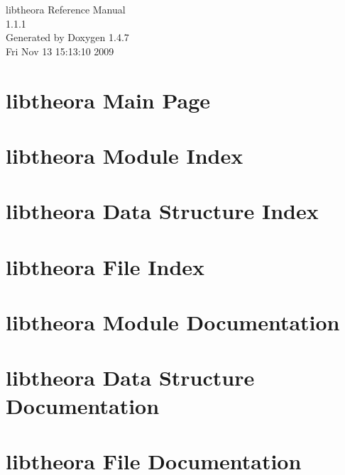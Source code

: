 \documentclass[a4paper]{book}
\begin{document}
\begin{titlepage}
\vspace*{7cm}
\begin{center}
{\Large libtheora Reference Manual\\[1ex]\large 1.1.1 }\\
\vspace*{1cm}
{\large Generated by Doxygen 1.4.7}\\
\vspace*{0.5cm}
{\small Fri Nov 13 15:13:10 2009}\\
\end{center}
\end{titlepage}
\clearemptydoublepage
{}
\tableofcontents
\clearemptydoublepage
{}
\chapter{libtheora Main Page}
\label{index}
\chapter{libtheora Module Index}

\chapter{libtheora Data Structure Index}

\chapter{libtheora File Index}

\chapter{libtheora Module Documentation}




\chapter{libtheora Data Structure Documentation}











\chapter{libtheora File Documentation}




\printindex
\end{document}

